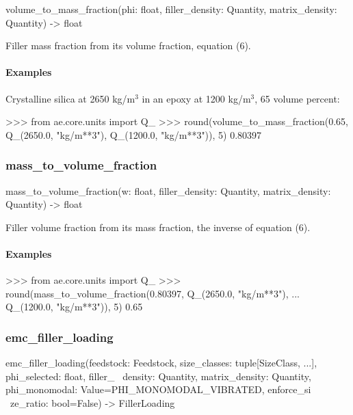 \documentclass[10pt,a4paper,twoside]{report}
\begin{document}
\begin{verbatimsmall}
volume_to_mass_fraction(phi: float, filler_density: Quantity, matrix_density: Quantity) -> float
\end{verbatimsmall}

Filler mass fraction from its volume fraction, equation (6).

\paragraph*{Examples}

Crystalline silica at 2650 kg/m$^{3}$ in an epoxy at 1200 kg/m$^{3}$, 65 volume percent:

\begin{doctestblock}
>>> from ae.core.units import Q_
>>> round(volume_to_mass_fraction(0.65, Q_(2650.0, "kg/m**3"), Q_(1200.0, "kg/m**3")), 5)
0.80397
\end{doctestblock}

\subsubsection*{mass\_to\_volume\_fraction}

\begin{verbatimsmall}
mass_to_volume_fraction(w: float, filler_density: Quantity, matrix_density: Quantity) -> float
\end{verbatimsmall}

Filler volume fraction from its mass fraction, the inverse of equation (6).

\paragraph*{Examples}

\begin{doctestblock}
>>> from ae.core.units import Q_
>>> round(mass_to_volume_fraction(0.80397, Q_(2650.0, "kg/m**3"),
...                               Q_(1200.0, "kg/m**3")), 5)
0.65
\end{doctestblock}

\subsubsection*{emc\_filler\_loading}

\begin{verbatimsmall}
emc_filler_loading(feedstock: Feedstock, size_classes: tuple[SizeClass, ...], phi_selected: float, filler_
    \ density: Quantity, matrix_density: Quantity, phi_monomodal: Value=PHI_MONOMODAL_VIBRATED, enforce_si
    \ ze_ratio: bool=False) -> FillerLoading
\end{verbatimsmall}
\end{document}
